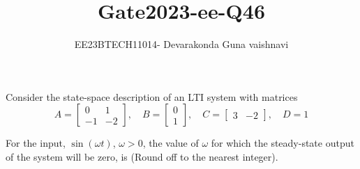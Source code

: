 \documentclass[12pt]{article}
\title{Gate2023-ee-Q46}
\author{EE23BTECH11014- Devarakonda Guna vaishnavi}
\begin{document}
\maketitle

Consider the state-space description of an LTI system with matrices
\[ 
A = \begin{bmatrix} 0 & 1 \\ -1 & -2 \end{bmatrix}, \quad 
B = \begin{bmatrix} 0 \\ 1 \end{bmatrix}, \quad 
C = \begin{bmatrix} 3 & -2 \end{bmatrix}, \quad 
D = 1 
\]

For the input, $\sin(\omega t)$, $\omega > 0$, the value of $\omega$ for which the steady-state output of the system will be zero, is \underline{\hspace{2cm}} (Round off to the nearest integer).
\end{document}
